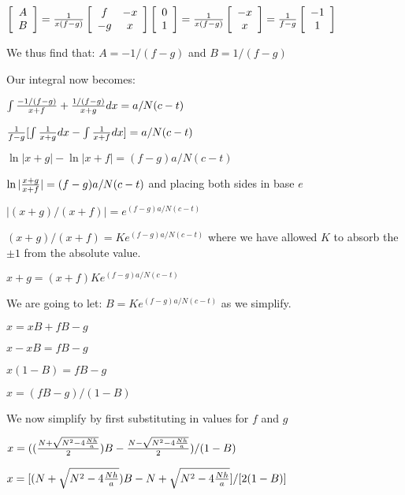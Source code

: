 \documentclass[12pt,letterpaper]{article}
\begin{document}
$\left[\begin{array}{c}
A\\
B\\\end{array}\right]={1\over x(f-g)}
\left[\begin{array}{cc}
f & -x \\
-g & x \\
\end{array}\right]
\left[\begin{array}{c}
0 \\
1 \\
\end{array}\right]=
{1\over x(f-g)}
\left[\begin{array}{c}
-x \\
x \\
\end{array}\right]=
{1\over f-g}
\left[\begin{array}{c}
-1 \\
1 \\
\end{array}\right]
$

We thus find that: $A=-1/(f-g)$ and $B=1/(f-g)$

Our integral now becomes:

$\int{-1/(f-g)\over x+f}+{1/(f-g)\over x+g}dx=a/N(c-t)$

${1\over f-g}[\int{1\over x+g}dx - \int{1\over x+f}dx]=a/N(c-t)$

$\ln{|x+g|}-\ln{|x+f|}=(f-g)a/N(c-t)$

$\ln|{x+g\over x+f}|=(f-g)a/N(c-t)$ and placing both sides in base $e$

$|(x+g)/(x+f)|=e^{(f-g)a/N(c-t)}$

$(x+g)/(x+f)=Ke^{(f-g)a/N(c-t)}$ where we have allowed $K$ to absorb the $\pm1$ from the absolute value.

$x+g = (x+f)Ke^{(f-g)a/N(c-t)}$ 

We are going to let: $B=Ke^{(f-g)a/N(c-t)}$ as we simplify.

$x=xB+fB -g$

$x-xB = fB-g$

$x(1-B) = fB-g$

$x = (fB-g)/(1-B)$

We now simplify by first substituting in values for $f$ and $g$

$x=(({N+\sqrt{N^2-4{Nh\over a}}\over 2})B-{N-\sqrt{N^2-4{Nh\over a}}\over 2})/(1-B)$

$x=[(N+\sqrt{N^2-4{Nh\over a}})B-N+\sqrt{N^2-4{Nh\over a}}]/[2(1-B)]$
\end{document}
